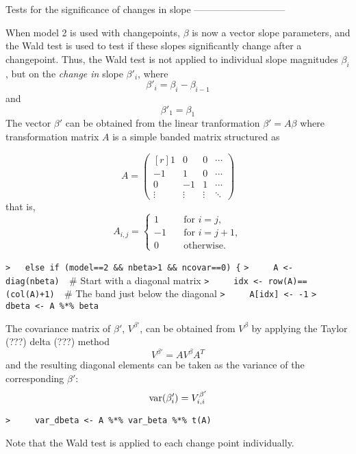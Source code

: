 \documentclass[a4paper]{article}
\begin{document}
Tests for the significance of changes in slope -----------------------------\par

When model 2 is used with changepoints, $\beta$ is now a vector slope parameters,
and the Wald test is used to test if these slopes significantly change after a changepoint.
Thus, the Wald test is not applied to individual slope magnitudes $\beta_i$,
but on the \emph{change in} slope $\beta'_i$, where
$$ \beta'_i = \beta_i - \beta_{i-1} $$ and $$ \beta'_1 = \beta_1 $$
The vector $\beta'$ can be obtained from the linear tranformation
$ \beta' = A \beta$
where transformation matrix $A$ is a simple banded matrix structured as\par


$$ A = \begin{pmatrix*}[r]
   1 &  0 & 0 & \cdots \\
  -1 &  1 & 0 & \cdots \\
   0 & -1 & 1 & \cdots \\
   \vdots & \vdots & \vdots & \ddots
  \end{pmatrix*} $$
that is,
\begin{equation}
  A_{i,j} = \begin{cases}
     1 &\quad\text{for $i=j$},\\
    -1 &\quad\text{for $i=j+1$},\\
     0 &\quad\text{otherwise}.
  \end{cases}
\end{equation}\par
\verb~>   else if (model==2 && nbeta>1 && ncovar==0) {~\newline
\verb~>     A <- diag(nbeta)  ~{\sffamily\# Start with a diagonal matrix}\newline
\verb~>     idx <- row(A)==(col(A)+1)  ~{\sffamily\# The band just below the diagonal}\newline
\verb~>     A[idx] <- -1~\newline
\verb~>     dbeta <- A %*% beta~\par
The covariance matrix of $\beta'$, $V^{\beta'}$, can be obtained from $V^\beta$ by
applying the Taylor (???) delta (???) method
$$ V^{\beta'} = A V^\beta A^T $$
and the resulting diagonal elements can be taken as the variance of the corresponding $\beta'$:
$$ \operatorname{var}(\beta'_i) = V^{\beta'}_{i,i} $$\par
\verb~>     var_dbeta <- A %*% var_beta %*% t(A)~\par
Note that the Wald test is applied to each change point individually.\par
\end{document}
